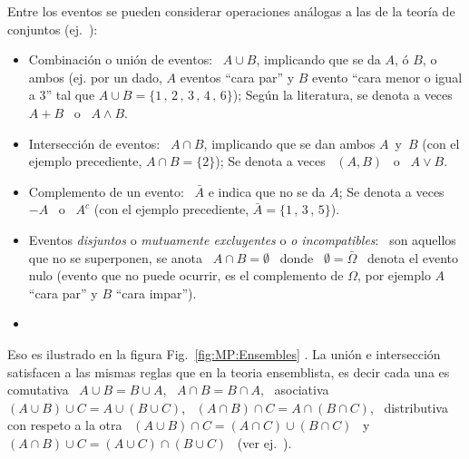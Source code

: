 Entre  los eventos  se  pueden considerar  operaciones  an\'alogas a  las de  la
teor\'ia de  conjuntos (ej.~\cite{Spi76,  Bre88, ManWol95, Sie75,  Sie76, Bor98,
  Bor09}):
%
\begin{itemize}
\item Combinaci\'on  o uni\'on de  eventos: \ $A  \cup B$, implicando que  se da
  $A$, \'o $B$, o ambos (ej. por  un dado, $A$ eventos ``cara par'' y $B$ evento
  ``cara menor o igual a 3'' tal que $A \cup B = \{1 \, , \, 2 \, , \, 3 \, , \,
  4 \,  , \, 6\}$); Seg\'un la  literatura, se denota a  veces \ $A+B$ \  o \ $A
  \wedge B$.
%
\item  Intersecci\'on de  eventos:  \ $A\cap  B$,  implicando que  se dan  ambos
  $A$~y~$B$ (con  el ejemplo precediente,  $A \cap  B = \{  2 \}$); Se  denota a
  veces \ $(A,B)$ \ o \ $A \vee B$.
%
\item Complemento de un evento: \ $\bar{A}$ e indica que no se da $A$; Se denota
  a veces \ $-A$  \ o \ $A^c$ (con el ejemplo precediente, $\bar{A}  = \{ 1 \, ,
  \, 3 \, , \, 5 \}$).
%
\item  Eventos  {\it  disjuntos}  o   {\it  mutuamente  excluyentes}  o  {\it  o
    incompatibles}: \ son aquellos que no se  superponen, se anota \ $A \cap B =
  \emptyset$  \ donde  \  $\emptyset =  \bar{\Omega}$  \ denota  el evento  nulo
  (evento que no  puede ocurrir, es el complemento de  $\Omega$, por ejemplo $A$
  ``cara par'' y $B$ ``cara impar'').
%
\item {}
\end{itemize}
%
\noindent Eso es ilustrado en la figura Fig.~\ref{fig:MP:Ensembles} .   La uni\'on  e
intersecci\'on satisfacen a  las mismas reglas que en  la teoria ensemblista, es
decir cada una es comutativa \ $A \cup B = B \cup A$, \ $A \cap B = B \cap A$, \
asociativa \ $(A \cup B)  \cup C = A \cup (B \cup C)$, \ $(A  \cap B) \cap C = A
\cap (B \cap C)$, \ distributiva con respeto a la otra \ $(A \cup B) \cap C = (A
\cap C) \cup (B \cap C)$ \ y \ $(A  \cap B) \cup C = (A \cup C) \cap (B \cup C)$
\  (ver  ej.~\cite{Jef48,  Jef73,   Hal50,  Fel71,  Bre88,  ManWol95,  IbaPar97,
  LehCas98, AthLah06, Coh13, HogMck13}).

